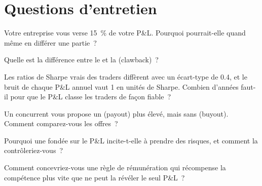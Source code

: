 \section{Questions d'entretien}

\begin{interviewq}\label{iq:fm:hiring-and-compensation:1}
Votre entreprise vous verse 15~\% de votre P\&L. Pourquoi pourrait-elle quand même en différer une partie~?
\end{interviewq}

\begin{interviewq}\label{iq:fm:hiring-and-compensation:2}
Quelle est la différence entre le  et la  (clawback)~?
\end{interviewq}

\begin{interviewq}\label{iq:fm:hiring-and-compensation:3}
Les ratios de Sharpe vrais des traders diffèrent avec un écart-type de 0.4, et le bruit de chaque P\&L annuel vaut 1 en unités de Sharpe. Combien d'années faut-il pour que le P\&L
classe les traders de façon fiable~?
\end{interviewq}

\begin{interviewq}\label{iq:fm:hiring-and-compensation:4}
Un concurrent vous propose un  (payout) plus élevé, mais sans  (buyout). Comment comparez-vous les offres~?
\end{interviewq}

\begin{interviewq}\label{iq:fm:hiring-and-compensation:5}
Pourquoi une  fondée sur le P\&L incite-t-elle à prendre des risques, et comment la contrôleriez-vous~?
\end{interviewq}

\begin{interviewq}\label{iq:fm:hiring-and-compensation:6}
Comment concevriez-vous une règle de rémunération qui récompense la compétence plus vite que ne peut la révéler le seul P\&L~?
\end{interviewq}
